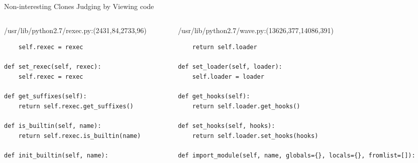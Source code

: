 \begin{frame}[shrink=30,fragile]{Non-interesting Clones Judging by Viewing code}

\lstset{
    breaklines=true,
    language=Python
}

\begin{columns}
\begin{column}[t]{0.48\textwidth}
/usr/lib/python2.7/rexec.py:(2431,84,2733,96)
\begin{lstlisting}
    self.rexec = rexec

def set_rexec(self, rexec):
    self.rexec = rexec

def get_suffixes(self):
    return self.rexec.get_suffixes()

def is_builtin(self, name):
    return self.rexec.is_builtin(name)

def init_builtin(self, name):
\end{lstlisting}
\end{column}

\begin{column}[t]{0.48\textwidth}
/usr/lib/python2.7/wave.py:(13626,377,14086,391)
\begin{lstlisting}
    return self.loader

def set_loader(self, loader):
    self.loader = loader

def get_hooks(self):
    return self.loader.get_hooks()

def set_hooks(self, hooks):
    return self.loader.set_hooks(hooks)

def import_module(self, name, globals={}, locals={}, fromlist=[]):
\end{lstlisting}

\end{column}
\end{columns}

\end{frame}


